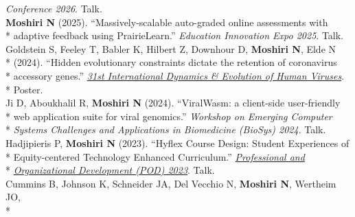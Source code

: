 \documentclass[margin,line]{res}
\begin{document}
\begin{resume}
\hspace*{8mm} \textit{Conference 2026}. Talk.\\
\hspace*{4mm} \textbf{Moshiri N} (2025). ``Massively-scalable auto-graded online assessments with\\*\vspace{2mm}
\hspace*{9.5mm} adaptive feedback using PrairieLearn.'' \textit{Education Innovation Expo 2025}. Talk.\\
\hspace*{4mm} Goldstein S, Feeley T, Babler K, Hilbert Z, Downhour D, \textbf{Moshiri N}, Elde N\\*
\hspace*{9.5mm} (2024). ``Hidden evolutionary constraints dictate the retention of coronavirus\\*
\hspace*{9.5mm} accessory genes.'' \href{https://cpd.ucsd.edu/hivdynamics/}{\textit{31st International Dynamics \& Evolution of Human Viruses}}.\\*\vspace{2mm}
\hspace*{8mm} Poster.\\
\hspace*{4mm} Ji D, Aboukhalil R, \textbf{Moshiri N} (2024). ``ViralWasm: a client-side user-friendly\\*
\hspace*{9.5mm} web application suite for viral genomics.'' \textit{Workshop on Emerging Computer}\\*\vspace{2mm}
\hspace*{8mm} \textit{Systems Challenges and Applications in Biomedicine (BioSys) 2024}. Talk.\\
\hspace*{4mm} Hadjipieris P, \textbf{Moshiri N} (2023). ``Hyflex Course Design: Student Experiences of\\*
\hspace*{9.5mm} Equity-centered Technology Enhanced Curriculum.'' \href{https://podnetwork.org/48th-annual-conference/}{\textit{Professional and}}\\*\vspace{2mm}
\hspace*{8mm} \href{https://podnetwork.org/48th-annual-conference/}{\textit{Organizational Development (POD) 2023}}. Talk.\\
\hspace*{4mm} Cummins B, Johnson K, Schneider JA, Del Vecchio N, \textbf{Moshiri N}, Wertheim JO,\\*

\end{resume}
\end{document}
